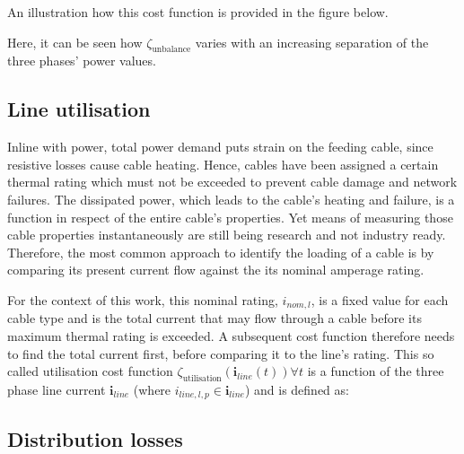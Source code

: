 

An illustration how this cost function is provided in the figure below.



Here, it can be seen how $\zeta_\text{unbalance}$ varies with an increasing separation of the three phases' power values.

\subsection{Line utilisation}
\label{ch1:subsec:line-utilisation}

Inline with power, total power demand puts strain on the feeding cable, since resistive losses cause cable heating.
Hence, cables have been assigned a certain thermal rating which must not be exceeded to prevent cable damage and network failures.
The dissipated power, which leads to the cable's heating and failure, is a function in respect of the entire cable's properties.
Yet means of measuring those cable properties instantaneously are still being research and not industry ready.
Therefore, the most common approach to identify the loading of a cable is by comparing its present current flow against the its nominal amperage rating.

For the context of this work, this nominal rating, $i_{nom,l}$, is a fixed value for each cable type and is the total current that may flow through a cable before its maximum thermal rating is exceeded.
A subsequent cost function therefore needs to find the total current first, before comparing it to the line's rating.
This so called utilisation cost function $\zeta_\text{utilisation}(\textbf{i}_{line}(t)) \forall t$ is a function of the three phase line current $\textbf{i}_{line}$ (where $i_{line,l,p} \in \textbf{i}_{line}$) and is defined as:



\subsection{Distribution losses}
\label{ch1:subsec:losses}





